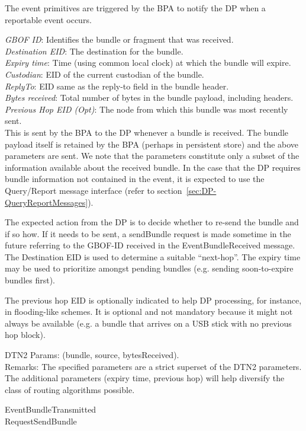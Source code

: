 The event primitives are triggered by the BPA to notify the DP when a 
reportable event occurs.\\[1em]


{
\metP
    {\em GBOF ID}: Identifies the bundle or fragment that was received.\\
    {\em Destination EID}: The destination for the bundle.\\
    {\em Expiry time}: Time (using common local clock) at which the
    bundle will expire.\\
    {\em Custodian}: EID of the current custodian of the bundle.\\
    {\em ReplyTo}: EID same as the reply-to field in the bundle header.\\
    {\em Bytes received}: Total number of bytes in the bundle payload, 
    including headers.\\
    {\em Previous Hop EID (Opt)}: The node from which this bundle was most 
    recently sent.\\


\metD
    This is sent by the BPA to the DP whenever a bundle is received.
    The bundle payload itself is retained by the BPA (perhaps in persistent
    store) and the above parameters are sent. We note that the parameters
    constitute only a subset of the information available about the received
    bundle. In the case that the DP requires bundle information not contained
    in the event, it is expected to use the Query/Report message interface
    (refer to section~\ref{sec:DP-QueryReportMessages}).

    The expected action from the DP is to decide whether to re-send
    the bundle and if so how. If it needs to be sent, a sendBundle
    request is made sometime in the future referring to the GBOF-ID
    received in the EventBundleReceived message. The Destination EID is
    used to determine a suitable ``next-hop''. The expiry
    time may be used to prioritize amongst pending bundles
    (e.g. sending soon-to-expire bundles first).

    The previous hop EID is optionally indicated to help DP processing, for
    instance, in flooding-like schemes. It is optional and not mandatory 
    because it might not always be available (e.g. a bundle that arrives on
    a USB stick with no previous hop block).

\metM
    DTN2 Params: (bundle, source, bytesReceived).\\ 
    Remarks: The specified parameters are a strict superset of the DTN2
    parameters. The additional parameters
    (expiry time, previous hop) will help diversify the class of
    routing algorithms possible.

\metR
    EventBundleTransmitted \\
    RequestSendBundle
}

